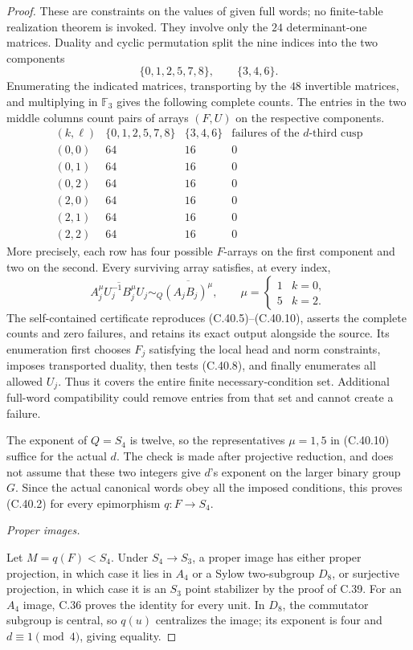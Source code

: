 \begin{proof}
These are constraints on the values of given full words;
no finite-table realization theorem is invoked.
They involve only the \(24\) determinant-one matrices.
Duality and cyclic permutation split the nine indices
into the two components
\[
          \{0,1,2,5,7,8\},\qquad \{3,4,6\}.
\]
Enumerating the indicated matrices, transporting by the
\(48\) invertible matrices, and multiplying in
\(\mathbb F_3\) gives the following complete counts.
The entries in the two middle columns count pairs of
arrays \((F,U)\) on the respective components.
\[
\begin{array}{c|c|c|c}
(k,\ell)&\{0,1,2,5,7,8\}&\{3,4,6\}
       &\text{failures of the }d\text{-third cusp}\\ \hline
(0,0)&64&16&0\\
(0,1)&64&16&0\\
(0,2)&64&16&0\\
(2,0)&64&16&0\\
(2,1)&64&16&0\\
(2,2)&64&16&0
\end{array}
 \tag{C.40.9}
\]
More precisely, each row has four possible \(F\)-arrays
on the first component and two on the second. Every
surviving array satisfies, at every index,
\[
 \overline{A_j^\mu U_j^{-1}B_j^\mu U_j}
       \sim_Q\overline{(A_jB_j)^\mu},
 \qquad
 \mu=\begin{cases}1&k=0,\\5&k=2.\end{cases}
 \tag{C.40.10}
\]
The self-contained certificate
reproduces (C.40.5)--(C.40.10), asserts the complete counts
and zero failures, and retains its exact output alongside
the source. Its enumeration first chooses \(F_j\) satisfying
the local head and norm constraints, imposes transported
duality, then tests (C.40.8), and finally enumerates all
allowed \(U_j\). Thus it covers the entire finite
necessary-condition set. Additional full-word compatibility
could remove entries from that set and cannot create a failure.

The exponent of \(Q=S_4\) is twelve, so the representatives
\(\mu=1,5\) in (C.40.10) suffice for the actual \(d\).
The check is made after projective reduction, and does
not assume that these two integers give \(d\)'s exponent
on the larger binary group \(G\). Since the actual
canonical words obey all the imposed conditions, this
proves (C.40.2) for every epimorphism \(q:F\to S_4\).

\emph{Proper images.}\par
Let \(M=q(F)<S_4\). Under \(S_4\to S_3\), a proper
image has either proper projection, in which case it
lies in \(A_4\) or a Sylow two-subgroup \(D_8\), or
surjective projection, in which case it is an \(S_3\)
point stabilizer by the proof of C.39.
For an \(A_4\) image, C.36 proves the identity for every
unit. In \(D_8\), the commutator subgroup is central,
so \(q(u)\) centralizes the image; its exponent is
four and \(d\equiv1\pmod4\), giving equality.


\end{proof}
